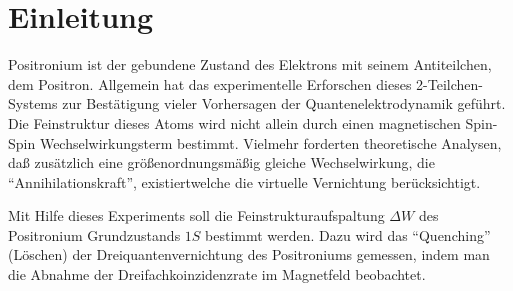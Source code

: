 \section{Einleitung}

Positronium ist der gebundene Zustand des Elektrons mit seinem Antiteilchen, dem Positron. Allgemein hat das experimentelle Erforschen dieses 2-Teilchen-Systems zur Bestätigung vieler Vorhersagen der Quantenelektrodynamik geführt. Die Feinstruktur dieses Atoms wird nicht allein durch einen magnetischen Spin-Spin Wechselwirkungsterm bestimmt. Vielmehr forderten theoretische Analysen, daß zusätzlich eine größenordnungsmäßig gleiche Wechselwirkung, die "`Annihilationskraft"', existiertwelche die virtuelle Vernichtung berücksichtigt.

Mit Hilfe dieses Experiments soll die Feinstrukturaufspaltung $\Delta W$ des Positronium Grundzustands $1 S$ bestimmt werden. Dazu wird das "`Quenching"' (Löschen) der Dreiquantenvernichtung des Positroniums gemessen, indem man die Abnahme der Dreifachkoinzidenzrate im Magnetfeld beobachtet. 